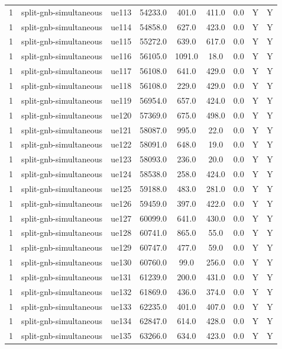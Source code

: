 \begin{table}[ht]
\begin{tabular}{|c|c|c|c|c|c|c|c|c|}
1 & split-gnb-simultaneous & ue113 & 54233.0 & 401.0 & 411.0 & 0.0 & Y & Y \\
1 & split-gnb-simultaneous & ue114 & 54858.0 & 627.0 & 423.0 & 0.0 & Y & Y \\
1 & split-gnb-simultaneous & ue115 & 55272.0 & 639.0 & 617.0 & 0.0 & Y & Y \\
1 & split-gnb-simultaneous & ue116 & 56105.0 & 1091.0 & 18.0 & 0.0 & Y & Y \\
1 & split-gnb-simultaneous & ue117 & 56108.0 & 641.0 & 429.0 & 0.0 & Y & Y \\
1 & split-gnb-simultaneous & ue118 & 56108.0 & 229.0 & 429.0 & 0.0 & Y & Y \\
1 & split-gnb-simultaneous & ue119 & 56954.0 & 657.0 & 424.0 & 0.0 & Y & Y \\
1 & split-gnb-simultaneous & ue120 & 57369.0 & 675.0 & 498.0 & 0.0 & Y & Y \\
1 & split-gnb-simultaneous & ue121 & 58087.0 & 995.0 & 22.0 & 0.0 & Y & Y \\
1 & split-gnb-simultaneous & ue122 & 58091.0 & 648.0 & 19.0 & 0.0 & Y & Y \\
1 & split-gnb-simultaneous & ue123 & 58093.0 & 236.0 & 20.0 & 0.0 & Y & Y \\
1 & split-gnb-simultaneous & ue124 & 58538.0 & 258.0 & 424.0 & 0.0 & Y & Y \\
1 & split-gnb-simultaneous & ue125 & 59188.0 & 483.0 & 281.0 & 0.0 & Y & Y \\
1 & split-gnb-simultaneous & ue126 & 59459.0 & 397.0 & 422.0 & 0.0 & Y & Y \\
1 & split-gnb-simultaneous & ue127 & 60099.0 & 641.0 & 430.0 & 0.0 & Y & Y \\
1 & split-gnb-simultaneous & ue128 & 60741.0 & 865.0 & 55.0 & 0.0 & Y & Y \\
1 & split-gnb-simultaneous & ue129 & 60747.0 & 477.0 & 59.0 & 0.0 & Y & Y \\
1 & split-gnb-simultaneous & ue130 & 60760.0 & 99.0 & 256.0 & 0.0 & Y & Y \\
1 & split-gnb-simultaneous & ue131 & 61239.0 & 200.0 & 431.0 & 0.0 & Y & Y \\
1 & split-gnb-simultaneous & ue132 & 61869.0 & 436.0 & 374.0 & 0.0 & Y & Y \\
1 & split-gnb-simultaneous & ue133 & 62235.0 & 401.0 & 407.0 & 0.0 & Y & Y \\
1 & split-gnb-simultaneous & ue134 & 62847.0 & 614.0 & 428.0 & 0.0 & Y & Y \\
1 & split-gnb-simultaneous & ue135 & 63266.0 & 634.0 & 423.0 & 0.0 & Y & Y \\

\end{tabular}
\end{table}
